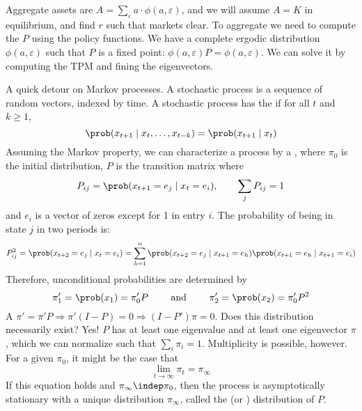 \documentclass[10pt]{article}
\begin{document}
Aggregate assets are $A = \sum_\varepsilon a \cdot\phi(a,\varepsilon)$, and we will assume $A = K$ in equilibrium, and find $r$ such that markets clear. To aggregate we need to compute the  $P$ using the policy functions. We have a complete ergodic distribution $\phi(a,\varepsilon)$ such that $P$ is a fixed point: $\phi(a,\varepsilon)P = \phi(a,\varepsilon)$. We can solve it by computing the TPM and fining the eigenvectors.

\begin{remark}
	A quick detour on Markov processes. A stochastic process is a sequence of random vectors, indexed by time. A stochastic process has the  if for all $t$ and $k \ge 1$,\[\prob(x_{t+1} \mid x_t,\dots,x_{t-k}) = \prob(x_{t+1} \mid x_t)\]Assuming the Markov property, we can characterize a process by a , where $\pi_0$ is the initial distribution, $P$ is the transition matrix where \[P_{ij} = \prob(x_{t+1}=e_j \mid x_t = e_i),\qquad \sum_{j}P_{ij} = 1\]and $e_i$ is a vector of zeros except for 1 in entry $i$. The probability of being in state $j$ in two periods is:\[P_{ij}^2 = \prob(x_{t+2} = e_j \mid x_t = e_i) = \sum_{h=1}^n \prob(x_{t+2} = e_j \mid x_{t+1} = e_h)\prob(x_{t+1} = e_h \mid x_{t+1} = e_i)\]Therefore, unconditional probabilities are determined by \[\pi_1' = \prob(x_1) = \pi_0'P\qquad \text{ and } \qquad \pi_2' = \prob(x_2) = \pi_0'P^2\]A  $\pi' = \pi' P \Longrightarrow \pi'(I-P) = 0 \Longrightarrow (I-P')\pi = 0$. Does this distribution necessarily exist? Yes! $P$ has at least one eigenvalue and at least one eigenvector $\pi$, which we can normalize such that $\sum_i \pi_i = 1$. Multiplicity is possible, however. For a given $\pi_0$, it might be the case that \[\lim_{t\to\infty} \pi_t = \pi_\infty\]If this equation holds and $\pi_\infty \indep \pi_0$, then the process is asymptotically stationary with a unique distribution $\pi_\infty$, called the  (or ) distribution of $P$.
\end{remark}
\end{document}
